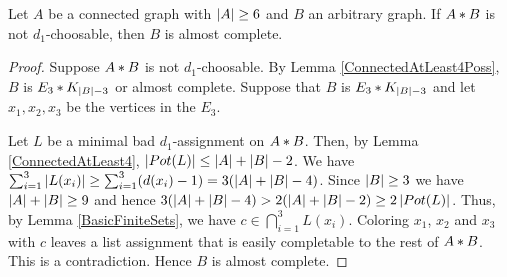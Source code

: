 \begin{lem}\label{ConnectedAtLeast6Poss}
Let $A$ be a connected graph with $\left|A\right| \geq 6$ and $B$ an arbitrary graph. If $A \mbox{\hspace{2 pt}$\ast$\hspace{2 pt}} B$ is not $d_1$-choosable, then $B$ is almost complete.
\end{lem}
\begin{proof}
Suppose $A \mbox{\hspace{2 pt}$\ast$\hspace{2 pt}} B$ is not $d_1$-choosable.  By Lemma \ref{ConnectedAtLeast4Poss}, $B$ is $E_3 \mbox{\hspace{2 pt}$\ast$\hspace{2 pt}} K_{\left|B\right| - 3}$ or almost complete.  Suppose that $B$ is $E_3 \mbox{\hspace{2 pt}$\ast$\hspace{2 pt}} K_{\left|B\right| - 3}$ and let $x_1, x_2, x_3$ be the vertices in the $E_3$.

Let $L$ be a minimal bad $d_1$-assignment on $A \mbox{\hspace{2 pt}$\ast$\hspace{2 pt}} B$. Then, by Lemma
\ref{ConnectedAtLeast4}, $\left|Pot(L)\right| \leq \left|A\right| + \left|B\right| - 2$.  We have
$\sum_{i=1}^3 \left|L(x_i)\right| \geq \sum_{i=1}^3 (d(x_i) - 1) = 3(\left|A\right| + \left|B\right| - 4)$.  Since $\left|B\right| \geq 3$ we have $\left|A\right| + \left|B\right| \geq 9$ and hence $3(\left|A\right| + \left|B\right| - 4) > 2(\left|A\right| + \left|B\right| - 2) \geq 2\left|Pot(L)\right|$.  Thus, by Lemma \ref{BasicFiniteSets}, we have $c \in \bigcap_{i=1}^3 L(x_i)$.  Coloring $x_1$, $x_2$ and $x_3$ with $c$ leaves a list assignment that is easily completable to the rest of $A \mbox{\hspace{2 pt}$\ast$\hspace{2 pt}} B$.  This is a contradiction.  Hence $B$ is almost complete.
\end{proof}

